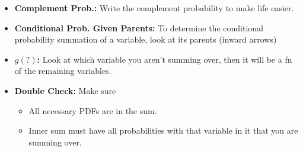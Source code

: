 \begin{warning}
    \begin{itemize}
        \item \textbf{Complement Prob.:} Write the complement probability to make life easier. 
        \item \textbf{Conditional Prob. Given Parents:} To determine the conditional probability summation of a variable, look at its parents (inward arrows)
        \item \textbf{$g(?)$:} Look at which variable you aren't summing over, then it will be a fn of the remaining variables.
        \item \textbf{Double Check:} Make sure 
        \begin{itemize}
            \item All necessary PDFs are in the sum. 
            \item Inner sum must have all probabilities with that variable in it that you are summing over. 
        \end{itemize}
    \end{itemize}
\end{warning}
\newpage

